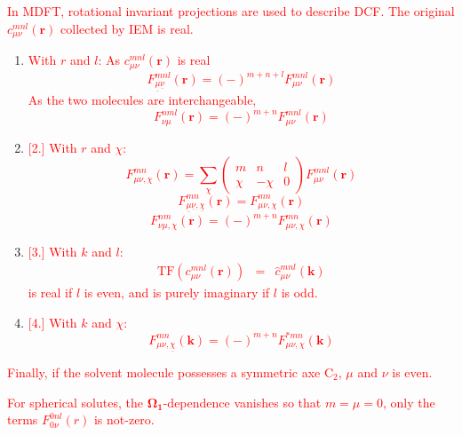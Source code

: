 \textcolor{red}{In MDFT, rotational invariant projections are used
to describe DCF. The original $c_{\mu\nu}^{mnl}(\mathbf{r})$ collected
by IEM is real.}
\begin{enumerate}
\item \textcolor{red}{With $r$ and $l$: As $c_{\mu\nu}^{mnl}(\mathbf{r})$
is real
\begin{equation}
F_{\underline{\mu}\underline{\nu}}^{mnl}(\mathbf{r})=\left(-\right)^{m+n+l}F_{\mu\nu}^{mnl}(\mathbf{r})
\end{equation}
As the two molecules are interchangeable, 
\begin{equation}
F_{\nu\mu}^{nml}(\mathbf{r})=\left(-\right)^{m+n}F_{\mu\nu}^{mnl}(\mathbf{r})
\end{equation}
}
\item \textcolor{red}{%
[2.]%
With $r$ and $\chi$:
\begin{equation}
F_{\mu\nu,\chi}^{mn}(\mathbf{r})=\sum_{\chi}\left(\begin{array}{ccc}
m & n & l\\
\chi & -\chi & 0
\end{array}\right)F_{\mu\nu}^{mnl}(\mathbf{r})
\end{equation}
\begin{equation}
F_{\underline{\mu}\underline{\nu},\underline{\chi}}^{mn}(\mathbf{r})=F_{\mu\nu,\chi}^{mn}(\mathbf{r})
\end{equation}
\begin{equation}
F_{\nu\mu,\chi}^{nm}(\mathbf{r})=\left(-\right)^{m+n}F_{\mu\nu,\chi}^{mn}(\mathbf{r})
\end{equation}
}
\item \textcolor{red}{%
[3.]%
With $k$ and $l$:
\begin{eqnarray}
\mathrm{TF}(c_{\mu\nu}^{mnl}(\mathbf{r})) & = & \hat{c}_{\mu\nu}^{mnl}(\mathbf{k})
\end{eqnarray}
 is real if $l$ is even, and is purely imaginary if $l$ is odd.}
\item \textcolor{red}{%
[4.]%
With $k$ and $\chi$:
\begin{equation}
F_{\mu\nu,\underline{\chi}}^{mn}(\mathbf{k})=\left(-\right)^{m+n}F_{\mu\nu,\chi}^{*mn}(\mathbf{k})
\end{equation}
}
\end{enumerate}
\textcolor{red}{Finally, if the solvent molecule possesses a symmetric
axe $\mathrm{C}_{2}$, $\mu$ and $\nu$ is even.} %

\textcolor{red}{For spherical solutes, the $\mathbf{\Omega_{1}}$-dependence
vanishes so that $m=\mu=0$, only the terms $F_{0\nu}^{0nl}(r)$ is
not-zero.}
